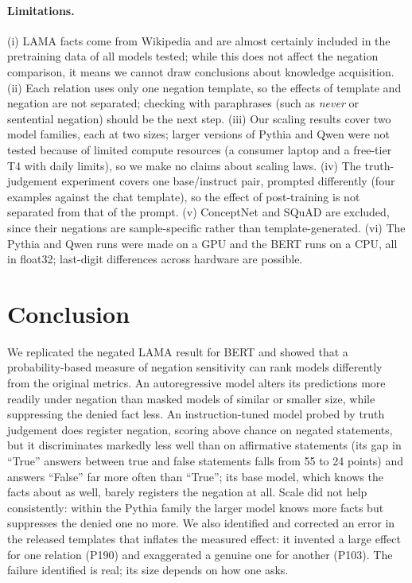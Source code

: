 \documentclass{article}
\begin{document}
\paragraph{Limitations.}
\label{sec:limitations}
(i) LAMA facts come from Wikipedia and are almost certainly included in the pretraining data of all models tested; while this does not affect the negation comparison, it means we cannot draw conclusions about knowledge acquisition. (ii) Each relation uses only one negation template, so the effects of template and negation are not separated; checking with paraphrases (such as \emph{never} or sentential negation) should be the next step. (iii) Our scaling results cover two model families, each at two sizes; larger versions of Pythia and Qwen were not tested because of limited compute resources (a consumer laptop and a free-tier T4 with daily limits), so we make no claims about scaling laws. (iv) The truth-judgement
experiment covers one base/instruct pair, prompted differently (four examples against the chat template), so the effect of post-training is not separated from that of the prompt. (v) ConceptNet and SQuAD are excluded, since their negations are
sample-specific rather than template-generated. (vi) The Pythia and Qwen runs were made on a GPU and the BERT runs on a CPU, all in float32; last-digit differences across hardware are possible.

\section{Conclusion}
\label{sec:conclusion}

We replicated the negated LAMA result for BERT and showed that a probability-based measure of negation
sensitivity can rank models differently from the original metrics. An autoregressive model alters its predictions more readily under negation than masked models of similar or smaller size, while suppressing the denied fact less. An
instruction-tuned model probed by truth judgement does register negation, scoring above chance on negated statements, but it discriminates markedly less well than on affirmative statements (its gap in ``True'' answers between true and false statements falls from 55 to 24 points) and answers ``False'' far more often than ``True''; its base model, which knows the facts about as well, barely registers the negation at all. Scale did not help consistently: within the Pythia family the larger model knows more facts but suppresses the denied
one no more. We also identified and corrected an error in the released templates that inflates the measured
effect: it invented a large effect for one relation (P190) and exaggerated a genuine one for another (P103). The
failure \citet{kassner2020} identified is real; its size depends on how one asks.
\end{document}
